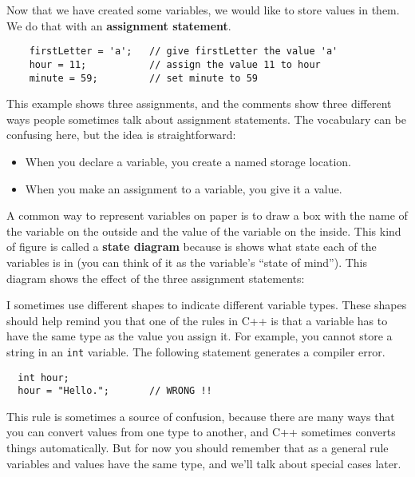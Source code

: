 Now that we have created some variables, we would like to
store values in them.  We do that with an {\bf assignment
statement}.

\begin{verbatim}
    firstLetter = 'a';   // give firstLetter the value 'a'
    hour = 11;           // assign the value 11 to hour
    minute = 59;         // set minute to 59
\end{verbatim}
%
This example shows three assignments, and the comments show
three different ways people sometimes talk about assignment
statements.  The vocabulary can be confusing here, but the
idea is straightforward:

\begin{itemize}

\item When you declare a variable, you create a named storage location.

\item When you make an assignment to a variable, you give it a value.

\end{itemize}

A common way to represent variables on paper is to draw a box
with the name of the variable on the outside and the value
of the variable on the inside.  This kind of figure is called
a {\bf state diagram} because is shows what state each of the
variables is in (you can think of it as the variable's ``state of
mind'').
This diagram shows
the effect of the three assignment statements:

\vspace{0.1in}
\centerline{}
\vspace{0.1in}

I sometimes use different shapes to indicate different
variable types.  These shapes should help remind you that one of the
rules in C++ is that a variable has to have the same type as the
value you assign it.  For example, you cannot store a string in
an {\tt int} variable.  The following statement generates a compiler
error.

\begin{verbatim}
  int hour;
  hour = "Hello.";       // WRONG !!
\end{verbatim}
%
This rule is sometimes a source of confusion, because there are many
ways that you can convert values from one type to another, and C++
sometimes converts things automatically.  But for now you should
remember that as a general rule variables and values have the same
type, and we'll talk about special cases later.

